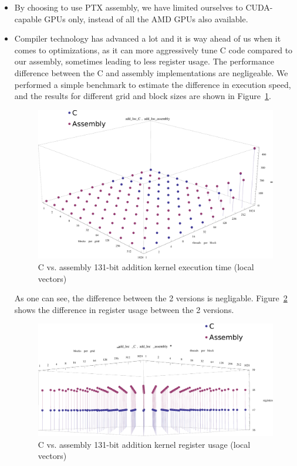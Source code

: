 \documentclass[10pt, a4paper]{report}
\begin{document}
\begin{itemize}
\item By choosing to use PTX assembly, we have limited ourselves to CUDA-capable
GPUs only, instead of all the AMD GPUs also available.
\item Compiler technology has advanced a lot and it is way ahead of us when it
comes to optimizations, as it can more aggressively tune C code compared to
our assembly, sometimes leading to less register usage.
The performance difference between the C and assembly implementations are
negligeable.
We performed a simple benchmark to estimate the difference in execution speed,
and the results for different grid and block sizes are shown in
Figure~\ref{fig:assembly_vs_c_loc_kepler_131_duration}.

\begin{figure}[h]
\centering
\includegraphics[scale=0.4]{figs/assembly_vs_c_loc_kepler_131_duration}
\caption{C vs. assembly 131-bit addition kernel execution time (local vectors)}
\label{fig:assembly_vs_c_loc_kepler_131_duration}
\end{figure}

As one can see, the difference between the 2 versions is negligable.
Figure~\ref{fig:assembly_vs_c_loc_kepler_131_registers} shows the difference in
register usage between the 2 versions.

\begin{figure}[h]
\centering
\includegraphics[scale=0.4]{figs/assembly_vs_c_loc_kepler_131_registers}
\caption{C vs. assembly 131-bit addition kernel register usage (local vectors)}
\label{fig:assembly_vs_c_loc_kepler_131_registers}
\end{figure}


\end{itemize}
\end{document}
